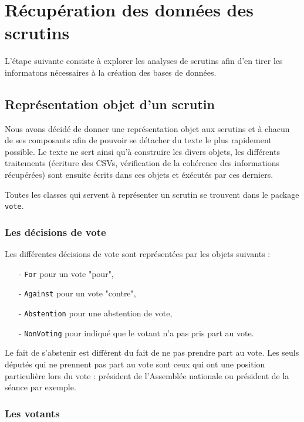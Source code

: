\section{Récupération des données des scrutins}

L'étape suivante consiste à explorer les analyses de scrutins afin d'en tirer les informatons nécessaires à la création des bases de données.

\subsection{Représentation objet d'un scrutin}

Nous avons décidé de donner une représentation objet aux scrutins et à chacun de ses composants afin de pouvoir se détacher du texte le plus rapidement possible. Le texte ne sert ainsi qu'à construire les divers objets, les différents traitements (écriture des CSVs, vérification de la cohérence des informations récupérées) sont ensuite écrits dans ces objets et éxécutés par ces derniers.

Toutes les classes qui servent à représenter un scrutin se trouvent dans le package \verb|vote|.

\subsubsection*{Les décisions de vote}

Les différentes décisions de vote sont représentées par les objets suivants :
\begin{itemize}
\item[-] \verb|For| pour un vote "pour",
\item[-] \verb|Against| pour un vote "contre",
\item[-] \verb|Abstention| pour une abstention de vote,
\item[-] \verb|NonVoting| pour indiqué que le votant n'a pas pris part au vote.
\end{itemize}

\vspace{0.3cm}
Le fait de s'abstenir est différent du fait de ne pas prendre part au vote. Les seuls députés qui ne prennent pas part au vote sont ceux qui ont une position particulière lors du vote : président de l'Assemblée nationale ou président de la séance par exemple.

\subsubsection*{Les votants}

